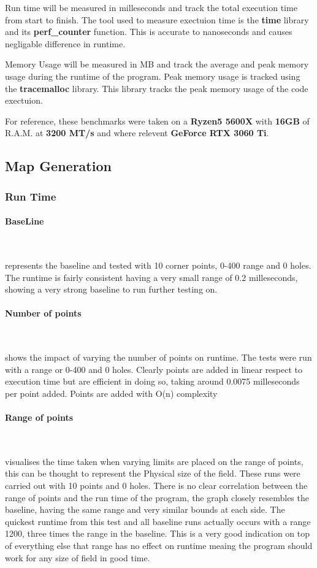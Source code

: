 \documentclass[final]{cmpreport_02}
\begin{document}
Run time will be measured in milleseconds and track the total execution time from start to finish.
The tool used to measure exectuion time  is the \textbf{time} library and its \textbf{perf\_counter} function.
This is accurate to nanoseconds and causes negligable difference in runtime.

Memory Usage will be measured in MB and track the average and peak memory usage during the runtime of the program.
Peak memory usage is tracked using the \textbf{tracemalloc} library.
This library tracks the peak memory usage of the code exectuion.

For reference, these benchmarks were taken on a \textbf{Ryzen5 5600X} with \textbf{16GB} of R.A.M. at \textbf{3200 MT/s} and where relevent \textbf{GeForce RTX 3060 Ti}.

\subsection{Map Generation}
\subsubsection{Run Time}
\paragraph{BaseLine} \

 represents the baseline and tested with 10 corner points, 0-400 range and 0 holes.
The runtime is fairly consistent having a very small range of 0.2 milleseconds, showing a very strong baseline to run further testing on.


\paragraph{Number of points} \

 shows the impact of varying the number of points on runtime.
The tests were run with a range or 0-400 and 0 holes.
Clearly points are added in linear respect to execution time but are efficient in doing so, taking around 0.0075 milleseconds per point added.
Points are added with O(n) complexity


\paragraph{Range of points} \

 visualises the time taken when varying limits are placed on the range of points, this can be thought to represent the Physical size of the field.
These runs were carried out with 10 points and 0 holes.
There is no clear correlation between the range of points and the run time of the program, the graph closely resembles the baseline, having the same range and very similar bounds at each side.
The quickest runtime from this test and all baseline runs actually occurs with a range 1200, three times the range in the baseline.
This is a very good indication on top of everything else that range has no effect on runtime meaing the program should work for any size of field in good time.
\end{document}

